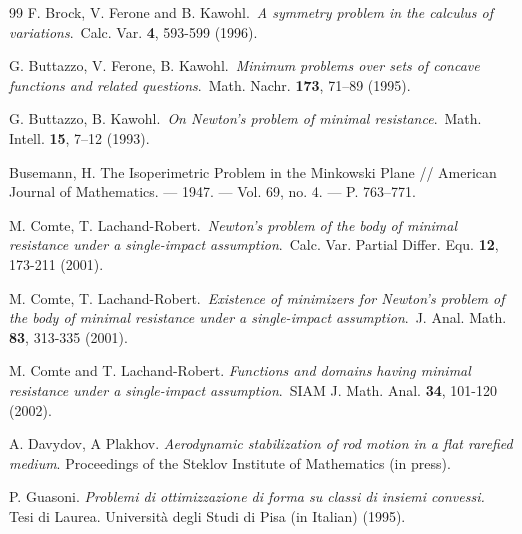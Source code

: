 \documentclass[a4paper,12pt]{article}
\theoremstyle{remark}
\theoremstyle{definition}
\begin{document}
\begin{thebibliography}{99}
F. Brock, V. Ferone and B. Kawohl.\, \textit{A symmetry problem in the calculus of variations}.\, Calc. Var. {\bf 4}, 593-599 (1996).

G. Buttazzo, V. Ferone, B. Kawohl.\,
\textit{Minimum problems over sets of concave functions and related questions}.\, Math. Nachr. {\bf 173}, 71--89 (1995).

G. Buttazzo, B. Kawohl.\, \textit{On Newton's problem of minimal resistance}.\, Math. Intell. {\bf 15}, 7--12 (1993).


 Busemann, H. The Isoperimetric Problem in the Minkowski Plane // American Journal of Mathematics. — 1947. — Vol. 69, no. 4. — P. 763–771.

M. Comte, T. Lachand-Robert.\, \textit{Newton's problem of the body of minimal resistance under a single-impact assumption}.\,
Calc. Var. Partial Differ. Equ. {\bf 12}, 173-211 (2001).

M. Comte, T. Lachand-Robert.\, \textit{Existence of minimizers for Newton's problem of the body of minimal resistance under a single-impact assumption}.\, J. Anal. Math. {\bf 83}, 313-335 (2001).

M. Comte and T. Lachand-Robert. {\it Functions and domains having minimal resistance under a single-impact assumption}.\, SIAM J. Math. Anal. {\bf 34}, 101-120 (2002).

A. Davydov, A Plakhov. {\it Aerodynamic stabilization of rod motion in a flat rarefied medium}. Proceedings of the Steklov Institute of Mathematics (in press).



P. Guasoni. {\it Problemi di ottimizzazione di forma su classi di insiemi convessi.} Tesi di Laurea. Università degli Studi di Pisa (in Italian) (1995).



\end{thebibliography}
\end{document}
